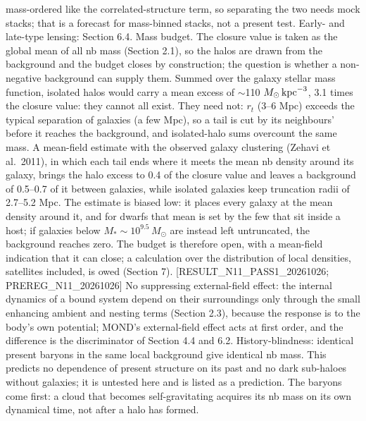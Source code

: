 \documentclass[
  10pt,
]{article}
\begin{document}
mass-ordered like the correlated-structure term, so separating the two needs mock stacks; that is a forecast for mass-binned stacks, not a present test. Early- and late-type lensing: Section 6.4. Mass budget. The closure value is taken as the global mean of all nb mass (Section 2.1), so the halos are drawn from the background and the budget closes by construction; the question is whether a non-negative background can supply them. Summed over the galaxy stellar mass function, isolated halos would carry a mean excess of $\sim$110 $M_\odot\,{\rm kpc}^{-3}$, 3.1 times the closure value: they cannot all exist. They need not: $r_t$ (3--6 Mpc) exceeds the typical separation of galaxies (a few Mpc), so a tail is cut by its neighbours' before it reaches the background, and isolated-halo sums overcount the same mass. A mean-field estimate with the observed galaxy clustering (Zehavi et al.~2011), in which each tail ends where it meets the mean nb density around its galaxy, brings the halo excess to 0.4 of the closure value and leaves a background of 0.5--0.7 of it between galaxies, while isolated galaxies keep truncation radii of 2.7--5.2 Mpc. The estimate is biased low: it places every galaxy at the mean density around it, and for dwarfs that mean is set by the few that sit inside a host; if galaxies below $M_*\sim10^{9.5}\,M_\odot$ are instead left untruncated, the background reaches zero. The budget is therefore open, with a mean-field indication that it can close; a calculation over the distribution of local densities, satellites included, is owed (Section 7). {[}RESULT\_N11\_PASS1\_20261026; PREREG\_N11\_20261026{]}
No suppressing external-field effect: the internal dynamics of a bound
system depend on their surroundings only through the small enhancing
ambient and nesting terms (Section 2.3), because the response is to the
body's own potential; MOND's external-field effect acts at first order,
and the difference is the discriminator of Section 4.4 and 6.2.
History-blindness: identical present baryons in the same local background give identical nb mass.
This predicts no dependence of present structure on its past and no dark
sub-haloes without galaxies; it is untested here and is listed as a
prediction. The baryons come first: a cloud that becomes
self-gravitating acquires its nb mass on its own dynamical time, not
after a halo has formed.
\end{document}
